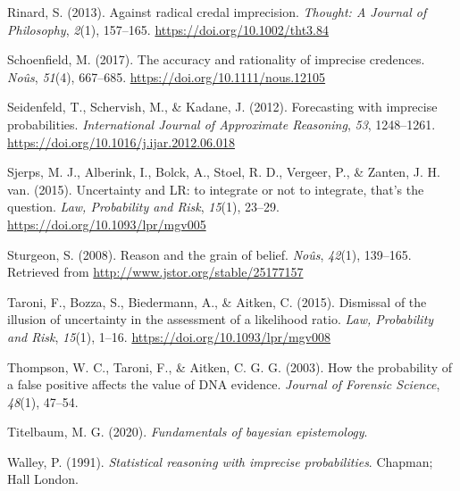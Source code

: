 \documentclass[
  10pt,
  dvipsnames,enabledeprecatedfontcommands]{scrartcl}
\newlength{\cslhangindent}
\newlength{\cslentryspacingunit} %
\newenvironment{CSLReferences}[2] %
 {%
  \setlength{\parindent}{0pt}
  \ifodd #1
  \let\oldpar\par
  \def\par{\hangindent=\cslhangindent\oldpar}
  \fi
  \setlength{\parskip}{#2\cslentryspacingunit}
 }%
 {}
\begin{document}
\begin{CSLReferences}{1}{0}
\leavevmode{}%
Rinard, S. (2013). Against radical credal imprecision. \emph{Thought: A
Journal of Philosophy}, \emph{2}(1), 157--165.
\url{https://doi.org/10.1002/tht3.84}

\leavevmode{}%
Schoenfield, M. (2017). The accuracy and rationality of imprecise
credences. \emph{Noûs}, \emph{51}(4), 667--685.
\url{https://doi.org/10.1111/nous.12105}

\leavevmode{}%
Seidenfeld, T., Schervish, M., \& Kadane, J. (2012). Forecasting with
imprecise probabilities. \emph{International Journal of Approximate
Reasoning}, \emph{53}, 1248--1261.
\url{https://doi.org/10.1016/j.ijar.2012.06.018}

\leavevmode{}%
Sjerps, M. J., Alberink, I., Bolck, A., Stoel, R. D., Vergeer, P., \&
Zanten, J. H. van. (2015). {Uncertainty and LR: to integrate or not to
integrate, that's the question}. \emph{Law, Probability and Risk},
\emph{15}(1), 23--29. \url{https://doi.org/10.1093/lpr/mgv005}

\leavevmode{}%
Sturgeon, S. (2008). Reason and the grain of belief. \emph{No{û}s},
\emph{42}(1), 139--165. Retrieved from
\url{http://www.jstor.org/stable/25177157}

\leavevmode{}%
Taroni, F., Bozza, S., Biedermann, A., \& Aitken, C. (2015). {Dismissal
of the illusion of uncertainty in the assessment of a likelihood ratio}.
\emph{Law, Probability and Risk}, \emph{15}(1), 1--16.
\url{https://doi.org/10.1093/lpr/mgv008}

\leavevmode{}%
Thompson, W. C., Taroni, F., \& Aitken, C. G. G. (2003). How the
probability of a false positive affects the value of {DNA} evidence.
\emph{Journal of Forensic Science}, \emph{48}(1), 47--54.

\leavevmode{}%
Titelbaum, M. G. (2020). \emph{Fundamentals of bayesian epistemology}.

\leavevmode{}%
Walley, P. (1991). \emph{Statistical reasoning with imprecise
probabilities}. Chapman; Hall London.

\end{CSLReferences}
\end{document}
